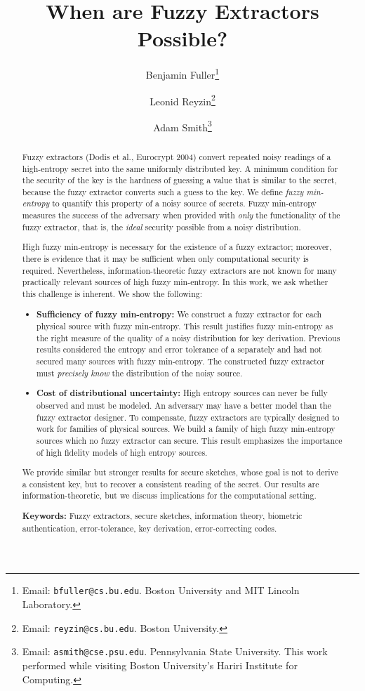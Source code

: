 \documentclass[11pt]{article}
\title{When are Fuzzy Extractors Possible?}
\author{
Benjamin Fuller\footnote{Email: {\tt bfuller@cs.bu.edu}.  Boston
  University and MIT Lincoln Laboratory.}  \and Leonid
Reyzin\footnote{Email: {\tt reyzin@cs.bu.edu}.  Boston University.}
\and Adam Smith\footnote{Email: {\tt asmith@cse.psu.edu}.
  Pennsylvania State University. This work performed while visiting Boston
  University's Hariri Institute for Computing.}}
\begin{document}
\maketitle

\begin{abstract}
Fuzzy extractors (Dodis et al., Eurocrypt 2004) convert repeated noisy readings of a high-entropy secret into the same uniformly distributed key. A minimum condition for the security of the key is the hardness of guessing a value that is similar to the secret, because the fuzzy extractor converts such a guess to the key.
We define \emph{fuzzy min-entropy} to quantify this property of a noisy source of secrets.  Fuzzy min-entropy measures the success of the adversary when provided with \emph{only} the functionality of the fuzzy extractor, that is, the \emph{ideal} security possible from a noisy distribution.  

High fuzzy min-entropy is necessary for the existence of a fuzzy extractor; moreover, there is evidence that it may be sufficient when only computational security is required. Nevertheless, information-theoretic fuzzy extractors are not known for many practically relevant sources of high fuzzy min-entropy. In this work, we ask whether this challenge is inherent.  We show the following:
\begin{itemize}
\item \textbf{Sufficiency of fuzzy min-entropy:}  We construct a fuzzy extractor for each physical source with fuzzy min-entropy.  This result justifies fuzzy min-entropy as the right measure of the quality of a noisy distribution for key derivation.  Previous results considered the entropy and error tolerance of a separately and had not secured many sources with fuzzy min-entropy.  
The constructed fuzzy extractor must \emph{precisely know} the distribution of the noisy source.
\item \textbf{Cost of distributional uncertainty:}  High entropy sources can never be fully observed and must be modeled.  An adversary may have a better model than the fuzzy extractor designer.  To compensate, fuzzy extractors are typically designed to work for families of physical sources. We build a family of high fuzzy min-entropy sources which no fuzzy extractor can secure.  This result emphasizes the importance of high fidelity models of high entropy sources.
\end{itemize}
We provide similar but stronger results for secure sketches, whose goal is not to derive a consistent key, but to recover a consistent reading of the secret.  Our results are information-theoretic, but we discuss implications for the computational setting. 

\medskip
\textbf{Keywords:} Fuzzy extractors, secure sketches, information theory, biometric authentication, error-tolerance, key derivation, error-correcting codes.
\end{abstract}
\end{document}
